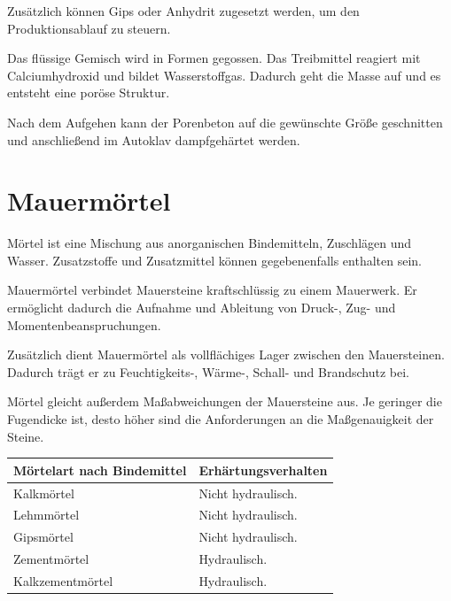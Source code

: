 \documentclass[
  12pt,
  a4paper,
  oneside
]{scrreprt}
\begin{document}
Zusätzlich können Gips oder Anhydrit zugesetzt werden, um den
Produktionsablauf zu steuern.


Das flüssige Gemisch wird in Formen gegossen. Das Treibmittel reagiert
mit Calciumhydroxid und bildet Wasserstoffgas. Dadurch geht die Masse
auf und es entsteht eine poröse Struktur.


Nach dem Aufgehen kann der Porenbeton auf die gewünschte Größe
geschnitten und anschließend im Autoklav dampfgehärtet werden.


\section{Mauermörtel}

Mörtel ist eine Mischung aus anorganischen Bindemitteln, Zuschlägen und
Wasser. Zusatzstoffe und Zusatzmittel können gegebenenfalls enthalten
sein.


Mauermörtel verbindet Mauersteine kraftschlüssig zu einem Mauerwerk. Er
ermöglicht dadurch die Aufnahme und Ableitung von Druck-, Zug- und
Momentenbeanspruchungen.


Zusätzlich dient Mauermörtel als vollflächiges Lager zwischen den
Mauersteinen. Dadurch trägt er zu Feuchtigkeits-, Wärme-, Schall- und
Brandschutz bei.


Mörtel gleicht außerdem Maßabweichungen der Mauersteine aus. Je geringer
die Fugendicke ist, desto höher sind die Anforderungen an die
Maßgenauigkeit der Steine.


\begin{longtable}{
  >{\raggedright\arraybackslash}p{}
  >{\raggedright\arraybackslash}p{}
}
\toprule
\textbf{Mörtelart nach Bindemittel} &
\textbf{Erhärtungsverhalten} \\
\midrule
\endhead

Kalkmörtel &
Nicht hydraulisch. \\

Lehmmörtel &
Nicht hydraulisch. \\

Gipsmörtel &
Nicht hydraulisch. \\

Zementmörtel &
Hydraulisch. \\

Kalkzementmörtel &
Hydraulisch. \\

\bottomrule
\end{longtable}
\end{document}
